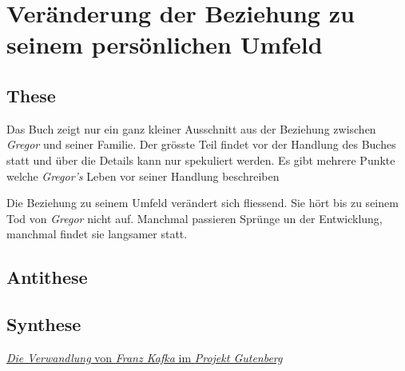 \documentclass[12pt,a4paper,twoside,titlepage]{article}
\begin{document}
	
	
	\section{Veränderung der Beziehung zu seinem persönlichen Umfeld}
	
	\subsection{These}
	
	Das Buch zeigt nur ein ganz kleiner Ausschnitt aus der Beziehung zwischen \textit{Gregor} und seiner Familie. Der grösste Teil findet vor der Handlung des Buches statt und über die Details kann nur spekuliert werden. Es gibt mehrere Punkte welche \textit{Gregor's} Leben vor seiner Handlung beschreiben
	
	Die Beziehung zu seinem Umfeld verändert sich fliessend. Sie hört bis zu seinem Tod von \textit{Gregor} nicht auf. Manchmal passieren Sprünge un der Entwicklung, manchmal findet sie langsamer statt. 
	
	\subsection{Antithese}
	
	\subsection{Synthese}
	
	
	
	\begin{thebibliography}{9}
		 \href{http://gutenberg.spiegel.de/buch/die-verwandlung-165/1}{\textit{Die Verwandlung} von \textit{Franz Kafka} im \textit{Projekt Gutenberg}}
%			
	\end{thebibliography}
	
	
	
	
\end{document}
